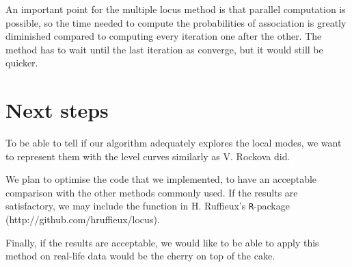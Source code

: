 \documentclass[a4paper, 11pt]{report}
\numberwithin{equation}{chapter}
\begin{document}
An important point for the multiple locus method is that parallel computation is possible, so the time needed to compute the probabilities of association is greatly diminished compared to computing every iteration one after the other. The method has to wait until the last iteration as converge, but it would still be quicker.

\section{Next steps}
To be able to tell if our algorithm adequately explores the local modes, we want to represent them with the level curves similarly as V. Rockova \cite{rockova} did.

We plan to optimise the code that we implemented, to have an acceptable comparison with the other methods commonly used. If the results are satisfactory, we may include the function in H. Ruffieux's \texttt{R}-package (http://github.com/hruffieux/locus).

Finally, if the results are acceptable, we would like to be able to apply this method on real-life data would be the cherry on top of the cake.
\newpage


\end{document}
